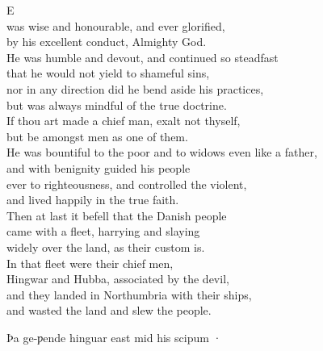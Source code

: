 \documentclass[10pt]{book}
\begin{document}
\vspace{0.2cm}

\begin{center}
\parbox{8.89cm}{
\lettrine[lines=4]{\color{BrickRed}E}{} \\
was wise and honourable, and ever glorified, \\
by his excellent conduct, Almighty God. \\
He was humble and devout, and continued so steadfast \\
that he would not yield to shameful sins, \\
nor in any direction did he bend aside his practices,\\
but was always mindful of the true doctrine. \\ 
If thou art made a chief man, exalt not thyself, \\
but be amongst men as one of them. \\
He was bountiful to the poor and to widows even like a father, \\
and with benignity guided his people \\
ever to righteousness, and controlled the violent,  \\
and lived happily in the true faith. \\
Then at last it befell that the Danish people \\
came with a fleet, harrying and slaying \\
widely over the land, as their custom is.  \\
In that fleet were their chief men, \\
Hingwar and Hubba, associated by the devil, \\
and they landed in Northumbria with their ships, \\
and wasted the land and slew the people. \\
}
\end{center}

\clearpage

Þa ge-ƿende hinguar east mid his scipum · \\
\end{document}
